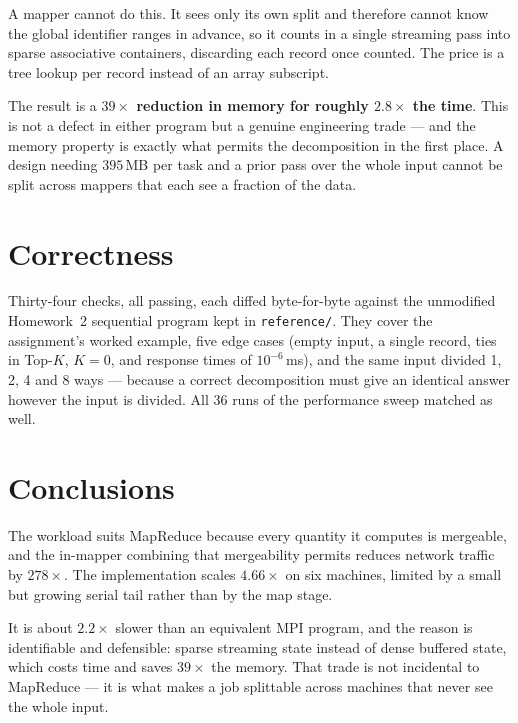 \documentclass[11pt,a4paper]{article}
\begin{document}
A mapper cannot do this. It sees only its own split and therefore cannot know
the global identifier ranges in advance, so it counts in a single streaming pass
into sparse associative containers, discarding each record once counted. The
price is a tree lookup per record instead of an array subscript.

The result is a \textbf{$39\times$ reduction in memory for roughly $2.8\times$
the time}. This is not a defect in either program but a genuine engineering
trade --- and the memory property is exactly what permits the decomposition in
the first place. A design needing $395$\,MB per task and a prior pass over the
whole input cannot be split across mappers that each see a fraction of the data.

\section{Correctness}

Thirty-four checks, all passing, each diffed byte-for-byte against the
unmodified Homework~2 sequential program kept in \texttt{reference/}. They cover
the assignment's worked example, five edge cases (empty input, a single record,
ties in Top-$K$, $K=0$, and response times of $10^{-6}$\,ms), and the same input
divided 1, 2, 4 and 8 ways --- because a correct decomposition must give an
identical answer however the input is divided. All $36$ runs of the performance
sweep matched as well.

\section{Conclusions}

The workload suits MapReduce because every quantity it computes is mergeable,
and the in-mapper combining that mergeability permits reduces network traffic by
$278\times$. The implementation scales $4.66\times$ on six machines, limited by
a small but growing serial tail rather than by the map stage.

It is about $2.2\times$ slower than an equivalent MPI program, and the reason is
identifiable and defensible: sparse streaming state instead of dense buffered
state, which costs time and saves $39\times$ the memory. That trade is not
incidental to MapReduce --- it is what makes a job splittable across machines
that never see the whole input.
\end{document}
